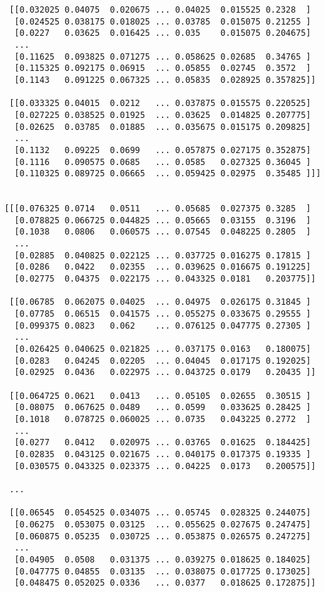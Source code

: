 \documentclass[
  letterpaper,
  DIV=11,
  numbers=noendperiod]{scrreprt}
\begin{document}
\begin{verbatim}
  [[0.032025 0.04075  0.020675 ... 0.04025  0.015525 0.2328  ]
   [0.024525 0.038175 0.018025 ... 0.03785  0.015075 0.21255 ]
   [0.0227   0.03625  0.016425 ... 0.035    0.015075 0.204675]
   ...
   [0.11625  0.093825 0.071275 ... 0.058625 0.02685  0.34765 ]
   [0.115325 0.092175 0.06915  ... 0.05855  0.02745  0.3572  ]
   [0.1143   0.091225 0.067325 ... 0.05835  0.028925 0.357825]]

  [[0.033325 0.04015  0.0212   ... 0.037875 0.015575 0.220525]
   [0.027225 0.038525 0.01925  ... 0.03625  0.014825 0.207775]
   [0.02625  0.03785  0.01885  ... 0.035675 0.015175 0.209825]
   ...
   [0.1132   0.09225  0.0699   ... 0.057875 0.027175 0.352875]
   [0.1116   0.090575 0.0685   ... 0.0585   0.027325 0.36045 ]
   [0.110325 0.089725 0.06665  ... 0.059425 0.02975  0.35485 ]]]


 [[[0.076325 0.0714   0.0511   ... 0.05685  0.027375 0.3285  ]
   [0.078825 0.066725 0.044825 ... 0.05665  0.03155  0.3196  ]
   [0.1038   0.0806   0.060575 ... 0.07545  0.048225 0.2805  ]
   ...
   [0.02885  0.040825 0.022125 ... 0.037725 0.016275 0.17815 ]
   [0.0286   0.0422   0.02355  ... 0.039625 0.016675 0.191225]
   [0.02775  0.04375  0.022175 ... 0.043325 0.0181   0.203775]]

  [[0.06785  0.062075 0.04025  ... 0.04975  0.026175 0.31845 ]
   [0.07785  0.06515  0.041575 ... 0.055275 0.033675 0.29555 ]
   [0.099375 0.0823   0.062    ... 0.076125 0.047775 0.27305 ]
   ...
   [0.026425 0.040625 0.021825 ... 0.037175 0.0163   0.180075]
   [0.0283   0.04245  0.02205  ... 0.04045  0.017175 0.192025]
   [0.02925  0.0436   0.022975 ... 0.043725 0.0179   0.20435 ]]

  [[0.064725 0.0621   0.0413   ... 0.05105  0.02655  0.30515 ]
   [0.08075  0.067625 0.0489   ... 0.0599   0.033625 0.28425 ]
   [0.1018   0.078725 0.060025 ... 0.0735   0.043225 0.2772  ]
   ...
   [0.0277   0.0412   0.020975 ... 0.03765  0.01625  0.184425]
   [0.02835  0.043125 0.021675 ... 0.040175 0.017375 0.19335 ]
   [0.030575 0.043325 0.023375 ... 0.04225  0.0173   0.200575]]

  ...

  [[0.06545  0.054525 0.034075 ... 0.05745  0.028325 0.244075]
   [0.06275  0.053075 0.03125  ... 0.055625 0.027675 0.247475]
   [0.060875 0.05235  0.030725 ... 0.053875 0.026575 0.247275]
   ...
   [0.04905  0.0508   0.031375 ... 0.039275 0.018625 0.184025]
   [0.047775 0.04855  0.03135  ... 0.038075 0.017725 0.173025]
   [0.048475 0.052025 0.0336   ... 0.0377   0.018625 0.172875]]


\end{verbatim}
\end{document}
